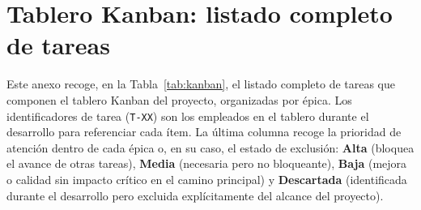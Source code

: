 \chapter{Tablero Kanban: listado completo de tareas}\label{cap:AnexoJ}

Este anexo recoge, en la Tabla~\ref{tab:kanban}, el listado completo de tareas que componen el tablero Kanban del proyecto, organizadas por épica. Los identificadores de tarea (\texttt{T-XX}) son los empleados en el tablero durante el desarrollo para referenciar cada ítem. La última columna recoge la prioridad de atención dentro de cada épica o, en su caso, el estado de exclusión: \textbf{Alta} (bloquea el avance de otras tareas), \textbf{Media} (necesaria pero no bloqueante), \textbf{Baja} (mejora o calidad sin impacto crítico en el camino principal) y \textbf{Descartada} (identificada durante el desarrollo pero excluida explícitamente del alcance del proyecto).

